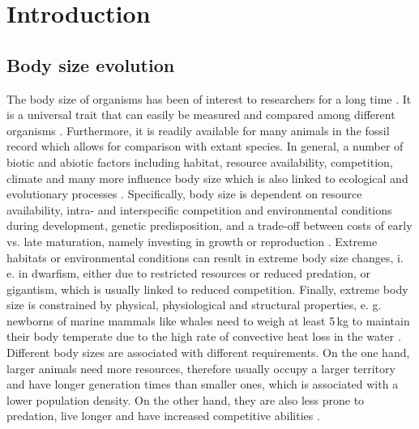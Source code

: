 \section{Introduction}
\subsection{Body size evolution}

The body size of organisms has been of interest to researchers for a long time \citep{Haldane1928,Peters1983}. It is a universal trait that can easily be measured and compared among different organisms \citep{Smith2016}. Furthermore, it is readily available for many animals in the fossil record which allows for comparison with extant species. In general, a number of biotic and abiotic factors including habitat, resource availability, competition, climate and many more influence body size which is also linked to ecological and evolutionary processes \citep{Blackburn1994a,Blueweiss1978,Smith2009}.
Specifically, body size is dependent on resource availability, intra- and interspecific competition and environmental conditions during development, genetic predisposition, and a trade-off between costs of early vs. late maturation, namely investing in growth or reproduction \citep{Stearns2000}. Extreme habitats or environmental conditions can result in extreme body size changes, i. e. in dwarfism, either due to restricted resources or reduced predation, or gigantism, which is usually linked to reduced competition. Finally, extreme body size is constrained by physical, physiological and structural properties, e. g. newborns of marine mammals like whales need to weigh at least 5\,kg to maintain their body temperate due to the high rate of convective heat loss in the water \citep{Downhower1988,Smith2016}.
Different body sizes are associated with different requirements. On the one hand, larger animals need more resources, therefore usually occupy a larger territory and have longer generation times than smaller ones, which is associated with a lower population density. On the other hand, they are also less prone to predation, live longer and have increased competitive abilities \citep{Stearns2000, Smith2016}. 


